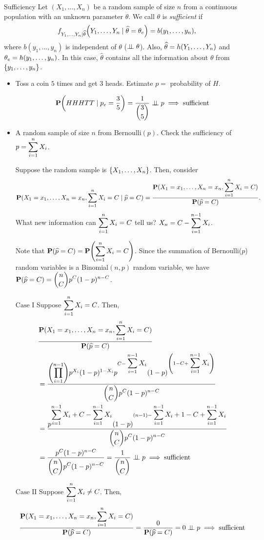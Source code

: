 \begin{df}{Sufficiency}
	Let $(X_1,\dots,X_n)$ be a random sample of size $n$ from a continuous population with an unknown parameter $\theta$. We call $\theta$ is \textit{sufficient} if \[f_{Y_1,\dots,Y_n\mid\widehat\theta}\qty(Y_1,\dots,Y_n\mid\widehat\theta=\theta_e)=b(y_1,\dots,y_n),\] where $b(y_1,\dots,y_n)$ is independent of $\theta$ ($\perp\!\!\!\perp\theta$). Also, $\widehat\theta=h\qty(Y_1,\dots,Y_n)$ and $\theta_e=h\qty(y_1,\dots,y_n)$. In this case, $\hat\theta$ contains all the information about $\theta$ from $\qty{y_1,\dots,y_n}$.
\end{df}
\begin{eg}
	\begin{itemize}
		\item Toss a coin $5$ times and get $3$ heads. Estimate $p=$ probability of $H$.
		\begin{sol}
			\[\vb{P}\qty(HHHTT\mid p_e=\dfrac{3}{5})=\dfrac{1}{\displaystyle\binom{3}{5}}\perp\!\!\!\perp p\implies\text{sufficient}\]
		\end{sol}
		\item A random sample of size $n$ from Bernoulli$(p)$. Check the sufficiency of $p=\displaystyle\sum_{i=1}^nX_i$.
		\begin{sol}
			Suppose the random sample is $\qty{X_1,\dots,X_n}$. Then, consider \[\vb{P}(X_1=x_1,\dots,X_n=x_n,\displaystyle\sum_{i=1}^nX_i=C\mid\widehat p=C)=\dfrac{\vb{P}(X_1=x_1,\dots,X_n=x_n,\displaystyle\sum_{i=1}^nX_i=C)}{\vb{P}\qty(\widehat{p}=C)}.\] What new information can $\displaystyle\sum_{i=1}^nX_i=C$ tell us? $X_n=C-\displaystyle\sum_{i=1}^{n-1}X_i$.\par 
			Note that $\vb{P}(\widehat{p}=C)=\vb{P}\qty(\displaystyle\sum_{i=1}^nX_i=C)$. Since the summation of Bernoulli($p$) random variables is a Binomial$(n,p)$ random variable, we have $\vb{P}(\widehat{p}=C)=\displaystyle\binom{n}{C}p^C(1-p)^{n-C}$.\par 
			$\boxed{\text{Case I}}$ Suppose $\displaystyle\sum_{i=1}^nX_i=C$. Then, \begin{align*}&\dfrac{\vb{P}(X_1=x_1,\dots,X_n=x_n,\displaystyle\sum_{i=1}^nX_i=C)}{\vb{P}\qty(\widehat{p}=C)}\\&=\dfrac{\qty(\displaystyle\prod_{i=1}^{n-1})p^{X_i}(1-p)^{1-X_i}p^{C-\displaystyle\sum_{i=1}^{n-1}X_i}(1-p)^{\qty(1-C+\displaystyle\sum_{i=1}^{n-1}X_i)}}{\displaystyle\binom{n}{C}p^C(1-p)^{n-C}}\\&=\dfrac{p^{\displaystyle\sum_{i=1}^{n-1}X_i+C-\sum_{i=1}^{n-1}X_i}(1-p)^{(n-1)-\displaystyle\sum_{i=1}^{n-1}X_i+1-C+\sum_{i=1}^{n-1}X_i}}{\displaystyle\binom{n}{C}p^C(1-p)^{n-C}}\\&=\dfrac{p^C(1-p)^{n-C}}{\displaystyle\binom{n}{C}p^C(1-p)^{n-C}}=\dfrac{1}{\displaystyle\binom{n}{C}}\perp\!\!\!\perp p\implies\text{sufficient}\end{align*}\par 
			$\boxed{\text{Case II}}$ Suppose $\displaystyle\sum_{i=1}^nX_i\neq C$. Then, \[\dfrac{\vb{P}(X_1=x_1,\dots,X_n=x_n,\displaystyle\sum_{i=1}^nX_i=C)}{\vb{P}\qty(\widehat{p}=C)}=\dfrac{0}{\vb{P}(\widehat{p}=C)}=0\perp\!\!\!\perp{p}\implies\text{sufficient}\]
		\end{sol}
	\end{itemize}	
\end{eg}
